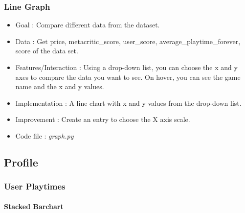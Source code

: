 \documentclass{article}
\begin{document}
    \subsubsection{Line Graph}
    \begin{itemize}
        \item Goal : Compare different data from the dataset.
        \item Data : Get price, metacritic\_score, user\_score, average\_playtime\_forever, score of the data set.
        \item Features/Interaction : Using a drop-down list, you can choose the x and y axes to compare the data you want to see. On hover, you can see the game name and the x and y values.
        \item Implementation : A line chart with x and y values from the drop-down list.
        \item Improvement : Create an entry to choose the X axis scale.
        \item Code file : \textit{graph.py}
    \end{itemize}

	\subsection{Profile}
    
   	\subsubsection{User Playtimes}
   	
        \paragraph{Stacked Barchart}
    
\end{document}
